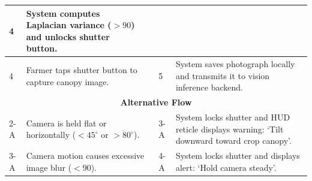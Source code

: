 \documentclass{FastFyp}
\begin{document}
\begin{table}[!ht]
\begin{tabular}{|lllll|}
  \multicolumn{1}{p{0.8cm}|}{4} &
  \multicolumn{1}{p{5.6cm}|}{System computes Laplacian variance ($> 90$) and unlocks shutter button.} \\ \hline
\multicolumn{1}{|p{0.8cm}|}{4} &
  \multicolumn{2}{p{6.0cm}|}{Farmer taps shutter button to capture canopy image.} &
  \multicolumn{1}{p{0.8cm}|}{5} &
  \multicolumn{1}{p{5.6cm}|}{System saves photograph locally and transmits it to vision inference backend.} \\ \hline
\multicolumn{5}{|c|}{\textbf{Alternative Flow}} \\ \hline
\multicolumn{1}{|p{0.8cm}|}{2-A} &
  \multicolumn{2}{p{6.0cm}|}{Camera is held flat or horizontally ($< 45^\circ$ or $> 80^\circ$).} &
  \multicolumn{1}{p{0.8cm}|}{3-A} &
  \multicolumn{1}{p{5.6cm}|}{System locks shutter and HUD reticle displays warning: `Tilt downward toward crop canopy'.} \\ \hline
\multicolumn{1}{|p{0.8cm}|}{3-A} &
  \multicolumn{2}{p{6.0cm}|}{Camera motion causes excessive image blur ($< 90$).} &
  \multicolumn{1}{p{0.8cm}|}{4-A} &
  \multicolumn{1}{p{5.6cm}|}{System locks shutter and displays alert: `Hold camera steady'.} \\ \hline
\end{tabular}
\end{table}
\end{document}
